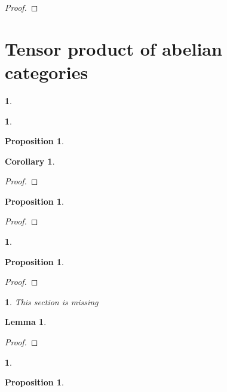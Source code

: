 \documentclass{article}
\newtheorem{env}[term]{}
\newtheorem{proposition}[term]{Proposition}
\newtheorem{cor}[term]{Corollary}
\newtheorem{lemma}[term]{Lemma}
\begin{document}
\begin{proof}
\end{proof}

\section{Tensor product of abelian categories}

\begin{env}
\end{env}

\begin{env}
\end{env}

\begin{proposition}
\end{proposition}

\begin{cor}
\end{cor}

\begin{proof}
\end{proof}

\begin{proposition}
\end{proposition}

\begin{proof}
\end{proof}

\begin{env}
\end{env}

\begin{proposition}
\end{proposition}

\begin{proof}
\end{proof}

\begin{env}
  This section is missing 
\end{env}

\begin{lemma}
\end{lemma}

\begin{proof}
\end{proof}

\begin{env}
\end{env}

\begin{proposition}
\end{proposition}
\end{document}
